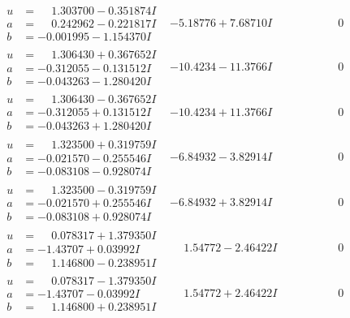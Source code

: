 \documentclass[1p]{elsarticle_modified}
\theoremstyle{definition}
\begin{document}
$$\begin{array}{c|c|c}
\begin{aligned}
u &= \phantom{-}1.303700 - 0.351874 I \\
a &= \phantom{-}0.242962 - 0.221817 I \\
b &= -0.001995 - 1.154370 I\end{aligned}
 & -5.18776 + 7.68710 I & \phantom{-0.000000 } 0 \\ \hline\begin{aligned}
u &= \phantom{-}1.306430 + 0.367652 I \\
a &= -0.312055 - 0.131512 I \\
b &= -0.043263 - 1.280420 I\end{aligned}
 & -10.4234 - 11.3766 I & \phantom{-0.000000 } 0 \\ \hline\begin{aligned}
u &= \phantom{-}1.306430 - 0.367652 I \\
a &= -0.312055 + 0.131512 I \\
b &= -0.043263 + 1.280420 I\end{aligned}
 & -10.4234 + 11.3766 I & \phantom{-0.000000 } 0 \\ \hline\begin{aligned}
u &= \phantom{-}1.323500 + 0.319759 I \\
a &= -0.021570 - 0.255546 I \\
b &= -0.083108 - 0.928074 I\end{aligned}
 & -6.84932 - 3.82914 I & \phantom{-0.000000 } 0 \\ \hline\begin{aligned}
u &= \phantom{-}1.323500 - 0.319759 I \\
a &= -0.021570 + 0.255546 I \\
b &= -0.083108 + 0.928074 I\end{aligned}
 & -6.84932 + 3.82914 I & \phantom{-0.000000 } 0 \\ \hline\begin{aligned}
u &= \phantom{-}0.078317 + 1.379350 I \\
a &= -1.43707 + 0.03992 I \\
b &= \phantom{-}1.146800 - 0.238951 I\end{aligned}
 & \phantom{-}1.54772 - 2.46422 I & \phantom{-0.000000 } 0 \\ \hline\begin{aligned}
u &= \phantom{-}0.078317 - 1.379350 I \\
a &= -1.43707 - 0.03992 I \\
b &= \phantom{-}1.146800 + 0.238951 I\end{aligned}
 & \phantom{-}1.54772 + 2.46422 I & \phantom{-0.000000 } 0\\

\end{array}$$
\end{document}
